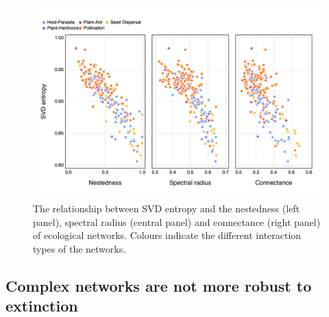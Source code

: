 \documentclass[10pt,oneside]{article}
\makeatletter
\def\maxwidth{\ifdim\Gin@nat@width>\linewidth\linewidth
\else\Gin@nat@width\fi}
\let\Oldincludegraphics\includegraphics
\renewcommand{\includegraphics}[1]{\Oldincludegraphics[width=\maxwidth]{#1}}
\makeatother
\begin{document}
\begin{figure}
\hypertarget{fig:other}{%
\centering
\includegraphics{figures/others_v_entropy.png}
\caption{The relationship between SVD entropy and the nestedness (left
panel), spectral radius (central panel) and connectance (right panel) of
ecological networks. Colours indicate the different interaction types of
the networks.}\label{fig:other}
}
\end{figure}

\hypertarget{complex-networks-are-not-more-robust-to-extinction}{%
\subsection{Complex networks are not more robust to
extinction}\label{complex-networks-are-not-more-robust-to-extinction}}
\end{document}
